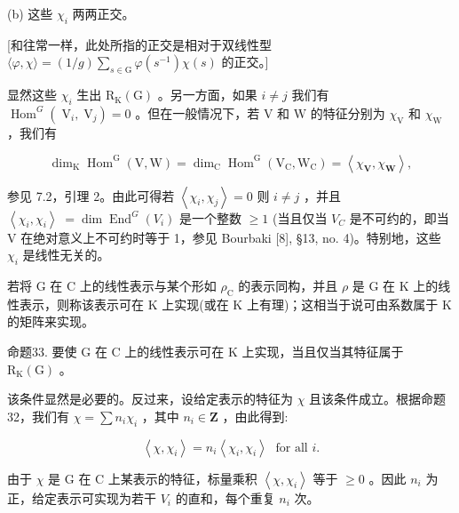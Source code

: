 \documentclass[10pt]{article}
\begin{document}
(b) 这些 \({\chi }_{i}\) 两两正交。

[和往常一样，此处所指的正交是相对于双线性型 \(\langle \varphi ,\chi \rangle  = \left( {1/g}\right) \mathop{\sum }\limits_{{s \in  \mathrm{G}}}\varphi \left( {s}^{-1}\right) \chi \left( s\right)\) 的正交。]

显然这些 \({\chi }_{i}\) 生出 \({\mathrm{R}}_{\mathrm{K}}\left( \mathrm{G}\right)\) 。另一方面，如果 \(i \neq  j\) 我们有 \({\operatorname{Hom}}^{G}\left( {{\mathrm{\;V}}_{i},{\mathrm{\;V}}_{j}}\right)  = 0\) 。但在一般情况下，若 \(\mathrm{V}\) 和 \(\mathrm{W}\) 的特征分别为 \({\chi }_{\mathrm{V}}\) 和 \({\chi }_{\mathrm{W}}\) ，我们有

\[
{\dim }_{\mathrm{K}}{\operatorname{Hom}}^{\mathrm{G}}\left( {\mathrm{V},\mathrm{W}}\right)  = {\dim }_{\mathrm{C}}{\operatorname{Hom}}^{\mathrm{G}}\left( {{\mathrm{V}}_{\mathrm{C}},{\mathrm{W}}_{\mathrm{C}}}\right)  = \left\langle  {{\chi }_{\mathbf{V}},{\chi }_{\mathbf{W}}}\right\rangle  ,
\]

参见 7.2，引理 2。由此可得若 \(\left\langle  {{\chi }_{i},{\chi }_{j}}\right\rangle   = 0\) 则 \(i \neq  j\) ，并且 \(\left\langle  {{\chi }_{i},{\chi }_{i}}\right\rangle \; = \dim {\operatorname{End}}^{G}\left( {V}_{i}\right)\) 是一个整数 \(\geq  1\) (当且仅当 \({V}_{C}\) 是不可约的，即当 V 在绝对意义上不可约时等于 1，参见 Bourbaki [8], §13, no. 4)。特别地，这些 \({\chi }_{i}\) 是线性无关的。

若将 \(\mathrm{G}\) 在 \(\mathrm{C}\) 上的线性表示与某个形如 \({\rho }_{\mathrm{C}}\) 的表示同构，并且 \(\rho\) 是 \(\mathrm{G}\) 在 \(\mathrm{K}\) 上的线性表示，则称该表示可在 \(\mathrm{K}\) 上实现(或在 \(\mathrm{K}\) 上有理)；这相当于说可由系数属于 \(\mathrm{K}\) 的矩阵来实现。

命题33. 要使 \(\mathrm{G}\) 在 \(\mathrm{C}\) 上的线性表示可在 \(\mathrm{K}\) 上实现，当且仅当其特征属于 \({\mathrm{R}}_{\mathrm{K}}\left( \mathrm{G}\right)\) 。

该条件显然是必要的。反过来，设给定表示的特征为 \(\chi\) 且该条件成立。根据命题32，我们有 \(\chi  = \sum {n}_{i}{\chi }_{i}\) ，其中 \({n}_{i} \in  \mathbf{Z}\) ，由此得到:

\[
\left\langle  {\chi ,{\chi }_{i}}\right\rangle   = {n}_{i}\left\langle  {{\chi }_{i},{\chi }_{i}}\right\rangle  \;\text{ for all }i.
\]

由于 \(\chi\) 是 \(\mathrm{G}\) 在 \(\mathrm{C}\) 上某表示的特征，标量乘积 \(\left\langle  {\chi ,{\chi }_{i}}\right\rangle\) 等于 \(\geq  0\) 。因此 \({n}_{i}\) 为正，给定表示可实现为若干 \({V}_{i}\) 的直和，每个重复 \({n}_{i}\) 次。
\end{document}
